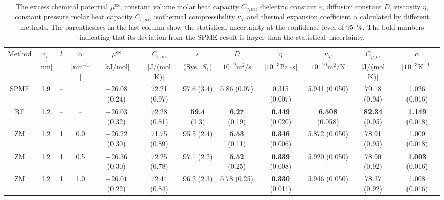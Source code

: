\documentclass[aip,jcp,a4paper,preprint,unsortedaddress,onecolumn,fleqn]{revtex4-1}
\newcommand{\eps}{\varepsilon}
\newcommand{\exc}{\textrm{ex}}
\newcommand{\systemsb}{S_1}
\begin{document}
\begin{sidewaystable}
  \centering
  \caption{The excess chemical potential $\mu^\exc$, constant volume molar heat capacity $C_{v,m}$, dielectric constant $\eps$, diffusion constant $D$, viscosity $\eta$, constant pressure molar heat capacity $C_{v,m}$, isothermal compressibility $\kappa_T$ and
    thermal expansion coefficient $\alpha$
    calculated by different methods.    
    The parenthesises in the last column show the statistical uncertainty
    at the confidence level of 95~\%.
    The bold numbers indicating that its deviation from the SPME result is larger than the statistical uncertainty.
  }
  \bigskip
  \centering\small\setlength\tabcolsep{2pt}
  \begin{tabular*}{0.99\textwidth}{@{\extracolsep{\fill}}cccc cccccccc}\hline\hline
    Method      &   $r_c$ &    $l$ & $\alpha$  & $\mu^\exc$  &$C_{v,m}$ &  $\eps$ & $D$ &  $\eta$  &  $\kappa_T$  & $C_{p,m}$ & $\alpha$ \\
                &    [nm] &        & [$\textrm{nm}^{-1}$] &   [kJ/mol] &[J/(mol K)] & (Sys.~$\systemsb$) & [$10^{-9}\textrm{m}^2/\textrm{s}$] &  [$10^{-3}\textrm{Pa}\cdot\textrm{s}$]  & [$10^{-10}\textrm{m}^2/\textrm{N}$] & [J/(mol K)] & [$10^{-3}\textrm{K}^{-1}$]\\\hline
    SPME        &1.9 & -- &    & $-26.08$ (0.24) & 72.21 (0.97)  & 97.6 (3.4)          & 5.86 (0.07)         & 0.315 (0.007)         & 5.941 (0.050)               &79.18 (0.94)           &1.026 (0.016)          \\
    RF          &1.2 & -- &--  & $-26.03$ (0.32) & 72.28 (0.81)  & \textbf{59.4} (1.3) & \textbf{6.27} (0.19)& \textbf{0.449} (0.020)& \textbf{6.508} (0.058)      &\textbf{82.34} (0.95)  &\textbf{1.149} (0.018) \\\hline
    ZM          &1.2 & 1  &0.0 & $-26.22$ (0.30) & 71.75 (0.89)  & 95.5 (2.4)          & \textbf{5.53} (0.11)& \textbf{0.346} (0.006)& 5.872 (0.050)               &78.91 (0.95)           &1.009 (0.018)          \\ 
    ZM          &1.2 & 1  &0.5 & $-26.36$ (0.30) & 72.25 (0.78)  & 97.1 (2.2)          & \textbf{5.52} (0.25)& \textbf{0.339} (0.008)& 5.920 (0.050)               &78.90 (0.92)           &\textbf{1.003} (0.016) \\ 
    ZM          &1.2 & 1  &1.0 & $-26.01$ (0.22) & 72.44 (0.84)  & 96.2 (2.3)          &        {5.78} (0.25)& \textbf{0.330} (0.011)& 5.946 (0.050)               &78.37 (0.92)           &1.008 (0.016)          \\ 

\end{tabular*}
\end{sidewaystable}
\end{document}
